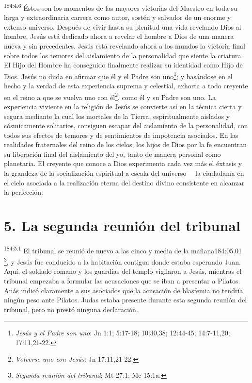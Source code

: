 \par
\textsuperscript{184:4.6} Éstos son los momentos de las mayores victorias del Maestro en toda su larga y extraordinaria carrera como autor, sostén y salvador de un enorme y extenso universo. Después de vivir hasta su plenitud una vida revelando Dios al hombre, Jesús está dedicado ahora a revelar el hombre a Dios de una manera nueva y sin precedentes. Jesús está revelando ahora a los mundos la victoria final sobre todos los temores del aislamiento de la personalidad que siente la criatura. El Hijo del Hombre ha conseguido finalmente realizar su identidad como Hijo de Dios. Jesús no duda en afirmar que él y el Padre son uno\footnote{\textit{Jesús y el Padre son uno}: Jn 1:1; 5:17-18; 10:30,38; 12:44-45; 14:7-11,20; 17:11,21-22.}; y basándose en el hecho y la verdad de esta experiencia suprema y celestial, exhorta a todo creyente en el reino a que se vuelva uno con él\footnote{\textit{Volverse uno con Jesús}: Jn 17:11,21-22.}, como él y su Padre son uno. La experiencia viviente en la religión de Jesús se convierte así en la técnica cierta y segura mediante la cual los mortales de la Tierra, espiritualmente aislados y cósmicamente solitarios, consiguen escapar del aislamiento de la personalidad, con todos sus efectos de temores y de sentimientos de impotencia asociados. En las realidades fraternales del reino de los cielos, los hijos de Dios por la fe encuentran su liberación final del aislamiento del yo, tanto de manera personal como planetaria. El creyente que conoce a Dios experimenta cada vez más el éxtasis y la grandeza de la socialización espiritual a escala del universo ---la ciudadanía en el cielo asociada a la realización eterna del destino divino consistente en alcanzar la perfección.

\section*{5. La segunda reunión del tribunal}
\par
\textsuperscript{184:5.1} El tribunal se reunió de nuevo a las cinco y media de la mañana184:05.01 \footnote{\textit{Segunda reunión del tribunal}: Mt 27:1; Mc 15:1a.}, y Jesús fue conducido a la habitación contigua donde estaba esperando Juan. Aquí, el soldado romano y los guardias del templo vigilaron a Jesús, mientras el tribunal empezaba a formular las acusaciones que se iban a presentar a Pilatos. Anás indicó claramente a sus asociados que la acusación de blasfemia no tendría ningún peso ante Pilatos. Judas estaba presente durante esta segunda reunión del tribunal, pero no prestó ninguna declaración.

